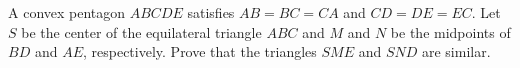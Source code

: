 A convex pentagon $ABCDE$ satisfies $AB=BC=CA$ and $CD=DE=EC$. Let $S$ be the center of the equilateral triangle $ABC$ and $M$ and $N$ be the midpoints of $BD$ and $AE$, respectively. Prove that the triangles $SME$ and $SND$ are similar.